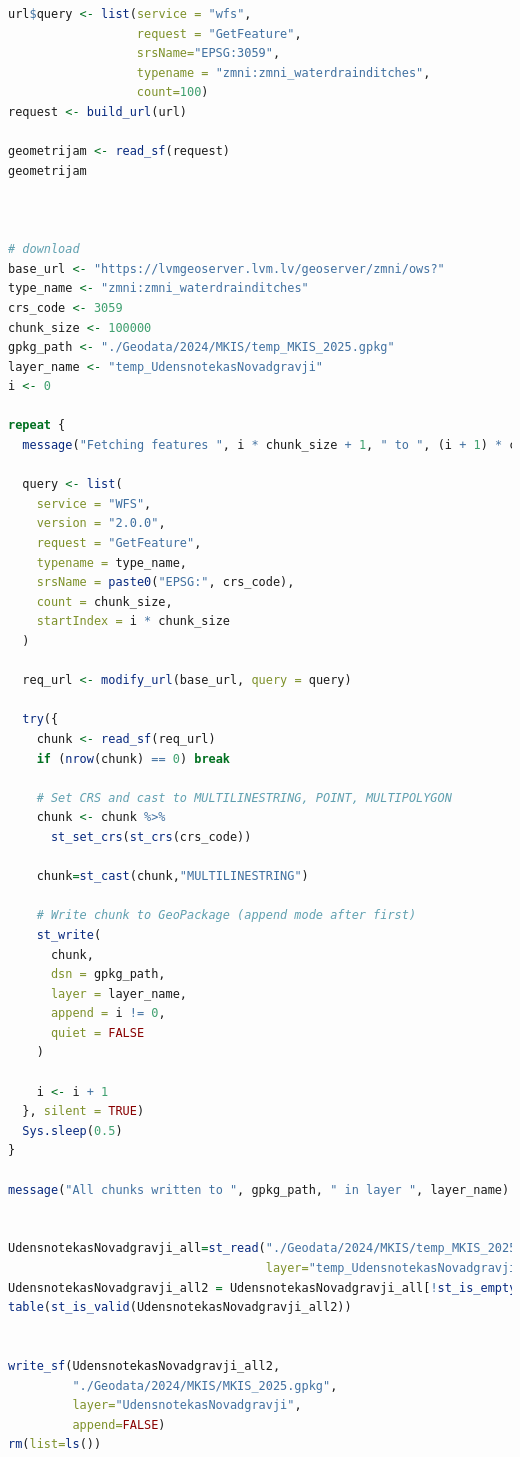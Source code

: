 \documentclass[
]{book}
\begin{document}
\begin{lstlisting}[language=R]
url$query <- list(service = "wfs",
                  request = "GetFeature",
                  srsName="EPSG:3059",
                  typename = "zmni:zmni_waterdrainditches",
                  count=100)
request <- build_url(url)

geometrijam <- read_sf(request)
geometrijam



# download
base_url <- "https://lvmgeoserver.lvm.lv/geoserver/zmni/ows?"
type_name <- "zmni:zmni_waterdrainditches"
crs_code <- 3059
chunk_size <- 100000
gpkg_path <- "./Geodata/2024/MKIS/temp_MKIS_2025.gpkg"
layer_name <- "temp_UdensnotekasNovadgravji"
i <- 0

repeat {
  message("Fetching features ", i * chunk_size + 1, " to ", (i + 1) * chunk_size, "...")
  
  query <- list(
    service = "WFS",
    version = "2.0.0",
    request = "GetFeature",
    typename = type_name,
    srsName = paste0("EPSG:", crs_code),
    count = chunk_size,
    startIndex = i * chunk_size
  )
  
  req_url <- modify_url(base_url, query = query)
  
  try({
    chunk <- read_sf(req_url)
    if (nrow(chunk) == 0) break
    
    # Set CRS and cast to MULTILINESTRING, POINT, MULTIPOLYGON
    chunk <- chunk %>%
      st_set_crs(st_crs(crs_code))
    
    chunk=st_cast(chunk,"MULTILINESTRING")
    
    # Write chunk to GeoPackage (append mode after first)
    st_write(
      chunk, 
      dsn = gpkg_path,
      layer = layer_name,
      append = i != 0,
      quiet = FALSE
    )
    
    i <- i + 1
  }, silent = TRUE)
  Sys.sleep(0.5)
}

message("All chunks written to ", gpkg_path, " in layer ", layer_name)


UdensnotekasNovadgravji_all=st_read("./Geodata/2024/MKIS/temp_MKIS_2025.gpkg",
                                    layer="temp_UdensnotekasNovadgravji")
UdensnotekasNovadgravji_all2 = UdensnotekasNovadgravji_all[!st_is_empty(UdensnotekasNovadgravji_all),,drop=FALSE] # 0
table(st_is_valid(UdensnotekasNovadgravji_all2))


write_sf(UdensnotekasNovadgravji_all2,
         "./Geodata/2024/MKIS/MKIS_2025.gpkg",
         layer="UdensnotekasNovadgravji",
         append=FALSE)
rm(list=ls())





\end{lstlisting}
\end{document}
